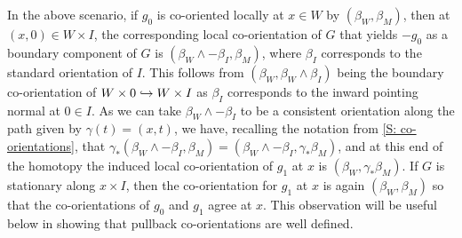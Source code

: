 \begin{remark}\label{R: stationary homotopy}
	In the above scenario, if $g_0$ is co-oriented locally at $x \in W$ by $(\beta_W,\beta_M)$, then at $(x,0) \in W \times I$, the corresponding local co-orientation of $G$ that yields $-g_0$ as a boundary component of $G$ is $(\beta_W \wedge -\beta_I, \beta_M)$, where $\beta_I$ corresponds to the standard orientation of $I$.
	This follows from $(\beta_W,\beta_W \wedge \beta_I)$ being the boundary co-orientation of $W \times 0 \hookrightarrow W \times I$ as $\beta_I$ corresponds to the inward pointing normal at $0 \in I$.
	As we can take $\beta_W \wedge -\beta_I$ to be a consistent orientation along the path given by $\gamma(t) = (x,t)$, we have, recalling the notation from \cref{S: co-orientations}, that $\gamma_*(\beta_W \wedge -\beta_I, \beta_M) = (\beta_W \wedge -\beta_I,\gamma_*\beta_M)$, and at this end of the homotopy the induced local co-orientation of $g_1$ at $x$ is $(\beta_W,\gamma_*\beta_M)$.
	If $G$ is stationary along $x \times I$, then the co-orientation for $g_1$ at $x$ is again $(\beta_W,\beta_M)$ so that the co-orientations of $g_0$ and $g_1$ agree at $x$.
	This observation will be useful below in showing that pullback co-orientations are well defined.
\end{remark}

